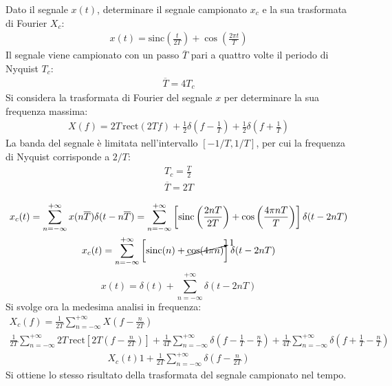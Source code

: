 \documentclass{article}
\newcommand{\rect}{\mathrm{rect}}
\newcommand{\sinc}{\mathrm{sinc}}
\begin{document}
Dato il segnale $x(t)$, determinare il segnale campionato $x_c$ e la sua trasformata di Fourier $X_c$:
\begin{gather*}
    x(t)=\sinc\left(\displaystyle\frac{t}{2T}\right)+\cos\left(\frac{2\pi t}{T}\right)
\end{gather*}
Il segnale viene campionato con un passo $\overline{T}$ pari a quattro volte il periodo di Nyquist $T_c$:
\begin{gather*}
    \overline{T}=4T_c
\end{gather*}
Si considera la trasformata di Fourier del segnale $x$ per determinare la sua frequenza massima:
\begin{gather*}
    X(f)=2T\,\rect(2Tf)+\displaystyle\frac{1}{2}\delta\left(f-\frac{1}{T}\right)+\frac{1}{2}\delta\left(f+\frac{1}{T}\right)
\end{gather*}
La banda del segnale è limitata nell'intervallo $[-1/T, 1/T]$, per cui la frequenza di Nyquist corrisponde a $2/T$:
\begin{gather*}
    T_c=\displaystyle\frac{T}{2}\\
    \overline{T}=2T
\end{gather*}

\begin{gather*}
    x_c(t)=\displaystyle\sum_{n=-\infty}^{+\infty}x(n\overline{T})\delta(t-n\overline{T})=\sum_{n=-\infty}^{+\infty}\left[\sinc\left(\frac{2nT}{2T}\right)+\cos\left(\frac{4\pi nT}{T}\right)\right]\delta(t-2nT)\\
    x_c(t)=\displaystyle\sum_{n=-\infty}^{+\infty}\left[\sinc(n)+\cancelto{1}{\cos(4\pi n)}\right]\delta(t-2nT)
\end{gather*}
\begin{equation}
    x(t)=\displaystyle\delta(t)+\sum_{n=-\infty}^{+\infty}\delta(t-2nT)
\end{equation}
Si svolge ora la medesima analisi in frequenza:
\begin{gather*}
    X_c(f)=\displaystyle\frac{1}{2T}\sum_{n=-\infty}^{+\infty}X\left(f-\frac{n}{2T}\right)\\
    \displaystyle\frac{1}{2T}\sum_{n=-\infty}^{+\infty}2T\,\rect\left[2T\left(f-\frac{n}{2T}\right)\right]+\frac{1}{4T}\sum_{n=-\infty}^{+\infty}\delta\left(f-\frac{1}{T}-\frac{n}{T}\right)+\frac{1}{4T}\sum_{n=-\infty}^{+\infty}\delta\left(f+\frac{1}{T}-\frac{n}{T}\right)
\end{gather*}
\begin{gather}
    X_c(t)1+\displaystyle\frac{1}{2T}\sum_{n=-\infty}^{+\infty}\delta\left(f-\frac{n}{2T}\right)
\end{gather}
Si ottiene lo stesso risultato della trasformata del segnale campionato nel tempo. 
\end{document}
